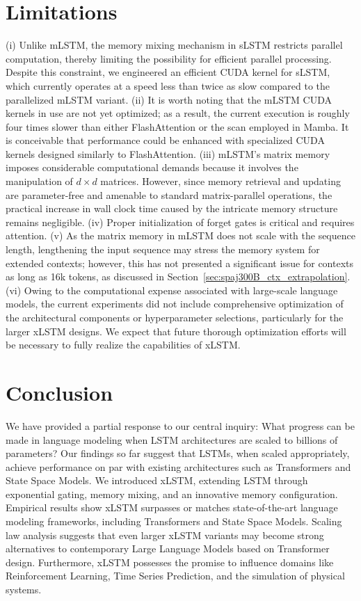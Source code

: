 \section{Limitations}

(i) Unlike mLSTM, the memory mixing mechanism in sLSTM restricts parallel computation, thereby limiting the possibility for efficient parallel processing. Despite this constraint, we engineered an efficient CUDA kernel for sLSTM, which currently operates at a speed less than twice as slow compared to the parallelized mLSTM variant. (ii) It is worth noting that the mLSTM CUDA kernels in use are not yet optimized; as a result, the current execution is roughly four times slower than either FlashAttention or the scan employed in Mamba. It is conceivable that performance could be enhanced with specialized CUDA kernels designed similarly to FlashAttention. (iii) mLSTM's matrix memory imposes considerable computational demands because it involves the manipulation of $d \times d$ matrices. However, since memory retrieval and updating are parameter-free and amenable to standard matrix-parallel operations, the practical increase in wall clock time caused by the intricate memory structure remains negligible. (iv) Proper initialization of forget gates is critical and requires attention. (v) As the matrix memory in mLSTM does not scale with the sequence length, lengthening the input sequence may stress the memory system for extended contexts; however, this has not presented a significant issue for contexts as long as 16k tokens, as discussed in Section~\ref{sec:spaj300B_ctx_extrapolation}. (vi) Owing to the computational expense associated with large-scale language models, the current experiments did not include comprehensive optimization of the architectural components or hyperparameter selections, particularly for the larger xLSTM designs. We expect that future thorough optimization efforts will be necessary to fully realize the capabilities of xLSTM.

\section{Conclusion}
We have provided a partial response to our central inquiry: What progress can be made in language modeling when LSTM architectures are scaled to billions of parameters? Our findings so far suggest that LSTMs, when scaled appropriately, achieve performance on par with existing architectures such as Transformers and State Space Models. We introduced xLSTM, extending LSTM through exponential gating, memory mixing, and an innovative memory configuration. Empirical results show xLSTM surpasses or matches state-of-the-art language modeling frameworks, including Transformers and State Space Models. Scaling law analysis suggests that even larger xLSTM variants may become strong alternatives to contemporary Large Language Models based on Transformer design. Furthermore, xLSTM possesses the promise to influence domains like Reinforcement Learning, Time Series Prediction, and the simulation of physical systems.


